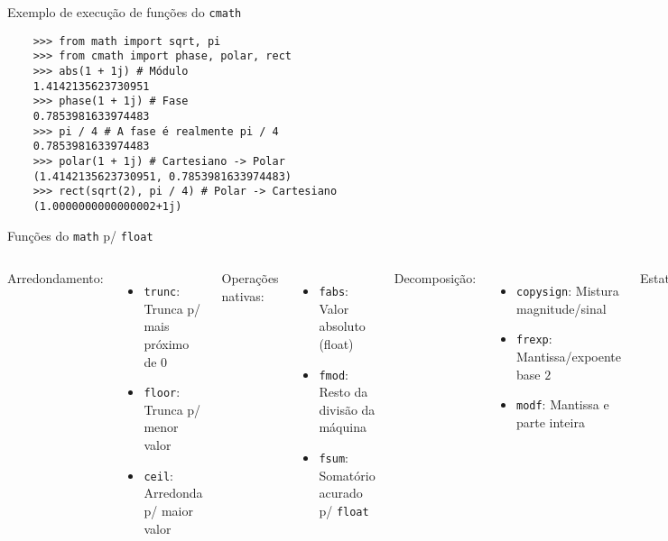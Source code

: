 \documentclass[utf8]{beamer}
\begin{document}
\begin{frame}[fragile]{Exemplo de execução
                       de funções do \texttt{cmath}}
  \begin{verbatim}
    >>> from math import sqrt, pi
    >>> from cmath import phase, polar, rect
    >>> abs(1 + 1j) # Módulo
    1.4142135623730951
    >>> phase(1 + 1j) # Fase
    0.7853981633974483
    >>> pi / 4 # A fase é realmente pi / 4
    0.7853981633974483
    >>> polar(1 + 1j) # Cartesiano -> Polar
    (1.4142135623730951, 0.7853981633974483)
    >>> rect(sqrt(2), pi / 4) # Polar -> Cartesiano
    (1.0000000000000002+1j)
  \end{verbatim}
\end{frame}


\begin{frame}{Funções do \texttt{math} p/ \texttt{float}}
  \begin{columns}
    Arredondamento:
    \begin{itemize}
      \item \texttt{trunc}: Trunca p/ mais próximo de 0
      \item \texttt{floor}: Trunca p/ menor valor
      \item \texttt{ceil}: Arredonda p/ maior valor
    \end{itemize}

    Operações nativas:
    \begin{itemize}
      \item \texttt{fabs}: Valor absoluto (float)
      \item \texttt{fmod}: Resto da divisão da máquina
      \item \texttt{fsum}: Somatório acurado p/
                                       \texttt{float}
    \end{itemize}

    Decomposição:
    \begin{itemize}
      \item \texttt{copysign}: Mistura magnitude/sinal
      \item \texttt{frexp}: Mantissa/expoente base $2$
      \item \texttt{modf}: Mantissa e parte inteira
    \end{itemize}

    Estatística:
    \begin{itemize}
      \item \texttt{gamma}: Gamma de Euler
      \item \texttt{erf}: Função erro (integral da normal)
    \end{itemize}


\end{columns}
\end{frame}
\end{document}
